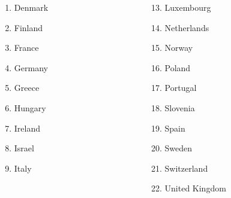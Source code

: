 \documentclass{beamer}
\begin{document}
\begin{frame}
\begin{columns}[T]
\begin{column}{4.5cm}
\begin{columns}
\begin{column}{2.2cm}
\begin{scriptsize}
\begin{enumerate}
						\item Denmark 	
						\item Finland 	
						\item France 	
						\item Germany 	
						\item Greece
						\item Hungary 
						\item Ireland 
						\item Israel 	
						\item Italy 										
					\end{enumerate}\end{scriptsize}
				\end{column}
				\begin{column}{2.5cm}
					\begin{scriptsize}\begin{enumerate}			
						\item[13.] Luxembourg			
						\item[14.] Netherlands
						\item[15.] Norway
						\item[16.] Poland
						\item[17.] Portugal
						\item[18.] Slovenia
						\item[19.] Spain
						\item[20.] Sweden
						\item[21.] Switzerland
						\item[22.] United Kingdom
					\end{enumerate}\end{scriptsize}
				\end{column}
			\end{columns}
		\end{column}
	\end{columns}
\end{frame} %
\end{document}
